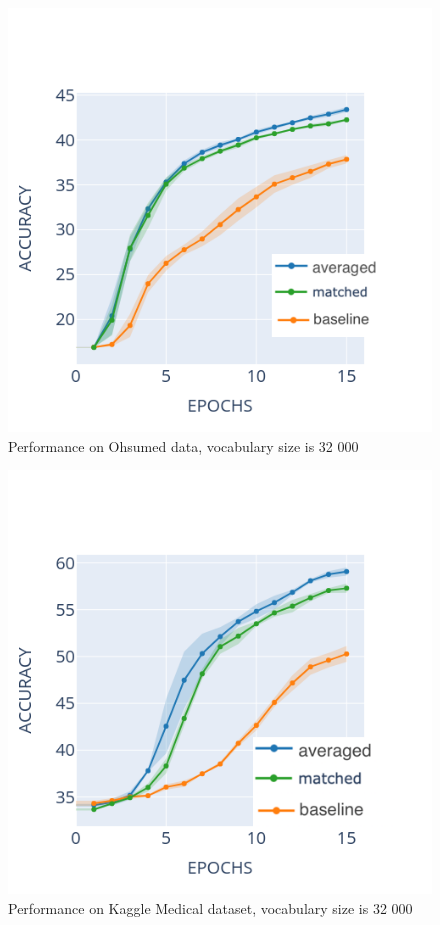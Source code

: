 \documentclass[11pt]{article}
\begin{document}
\begin{figure}[h]
		\centering
    	\includegraphics[scale=0.4]{ohsumed_32k_1e-6.png}
    	\caption{Performance on Ohsumed data, vocabulary size is 32 000}
    	\label{fig:len_lr}
\end{figure}

\begin{figure}[h]
		\centering
    	\includegraphics[scale=0.4]{illness_32k_1e-6.png}    
    	\caption{Performance on Kaggle Medical dataset, vocabulary size is 32 000}
    	\label{fig:kmd}
\end{figure}
\end{document}
